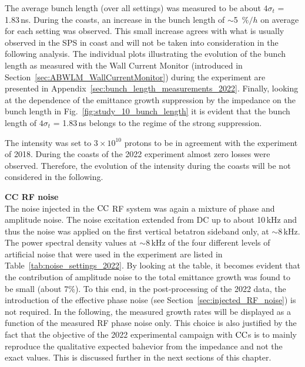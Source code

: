The average bunch length (over all settings) was measured to be about $4\sigma_t$ = 1.83\,ns. During the coasts, an increase in the bunch length of $\sim$5~$\%/h$ on average for each setting was observed. This small increase agrees with what is usually observed in the SPS in coast and will not be taken into consideration in the following analysis. The individual plots illustrating the evolution of the bunch length as measured with the Wall Current Monitor (introduced in Section~\ref{sec:ABWLM_WallCurrentMonitor}) during the experiment are presented in Appendix~\ref{sec:bunch_length_measurements_2022}. Finally, looking at the dependence of the emittance growth suppression by the impedance on the bunch length in Fig.~\ref{fig:study_10_bunch_length} it is evident that the bunch length of $4\sigma_t$ = 1.83\,ns belongs to the regime of the strong suppression.

The intensity was set to $3 \times 10^{10}$ protons to be in agreement with the experiment of 2018. During the coasts of the 2022 experiment almost zero losses were observed. Therefore, the evolution of the intensity during the coasts will be not considered in the following.


\textbf{CC RF noise}\\
The noise injected in the ${\mathrm{CC}}$ RF system was again a mixture of phase and amplitude noise. The noise excitation extended from DC up to about 10\,kHz and thus the noise was applied on the first vertical betatron sideband only, at $\sim$8\,kHz. The power spectral density values at $\sim$8\,kHz of the four different levels of artificial noise that were used in the experiment are listed in Table~\ref{tab:noise_settings_2022}. By looking at the table, it becomes evident that the contribution of amplitude noise to the total emittance growth was found to be small (about 7$\%$). To this end, in the post-processing of the 2022 data, the introduction of the effective phase noise (see Section~\ref{sec:injected_RF_noise}) is not required. In the following, the measured growth rates will be displayed as a function of the measured RF phase noise only. This choice is also justified by the fact that the objective of the 2022 experimental campaign with ${\mathrm{CC}}$s is to mainly reproduce the qualitative expected bahevior from the impedance and not the exact values. This is discussed further in the next sections of this chapter.



